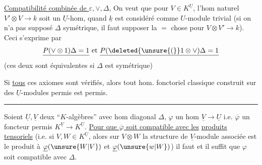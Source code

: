 \uline{Compatibilité combinée de $\varepsilon,\vee,\Delta$}, On veut que
pour $V\in K^{\underline U}$, l'hom naturel $V'\otimes V\longrightarrow k$
soit un $\underline U$-hom, quand $\underline k$ est considéré comme
$U$-module trivial (si on n'a pas supposé $\Delta$
symétrique, il faut supposer la $=$ chose pour
$V\otimes V'\longrightarrow k$). Ceci s'exprime par
\[ \underline{P(\vee\otimes1)\Delta=1}\ \text{et}\ \underline{P(\deleted{\unsure{(}}1\otimes\vee)\Delta=1} \]
(ces deux sont équivalentes si $\Delta$ est symétrique)

Si \uline{tous} ces axiomes sont vérifiés, alors
tout hom. fonctoriel classique construit sur
des $\underline U$-modules permis est permis.


\noindent\rule{2.5cm}{0.4pt}

Soient $\underline U,\underline V$ deux ``$K$-algèbres'' avec
hom diagonal $\Delta$, $\varphi$ un hom  $\underline V\longrightarrow\underline U$
i.e. $\overline\varphi$ un foncteur permis $K^{\underline V}\longrightarrow K^{\underline U}$.
\uline{Pour que $\overline\varphi$ soit compatible avec les}
\uline{produits tensoriels} (i.e. si $V,W\in K^{\underline U}$,
alors sur $V\otimes W$ la structure de $\underline V$-module
associée est le produit  à $\underline\varphi(\unsure{W|V})$ et $\underline\varphi(\unsure{w|W})$) il faut et il suffit
que $\varphi$ soit compatible avec $\Delta$.

